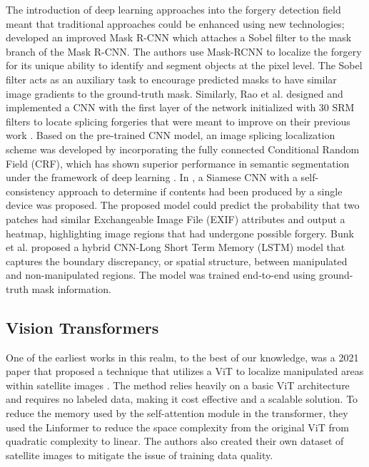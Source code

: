 The introduction of deep learning approaches into the forgery detection field meant that traditional approaches could be enhanced using new technologies; \cite{wang2019detection} developed an improved Mask R-CNN which attaches a Sobel filter to the mask branch of the Mask R-CNN. The authors use Mask-RCNN to localize the forgery for its unique ability to identify and segment objects at the pixel level. The Sobel filter acts as an auxiliary task to encourage predicted masks to have similar image gradients to the ground-truth mask. Similarly, Rao et al. \cite{Rao2020DeepLL} designed and implemented a CNN with the first layer of the network initialized with 30 SRM filters to locate splicing forgeries that were meant to improve on their previous work \cite{rao2016}. Based on the pre-trained CNN model, an image splicing localization scheme was developed by incorporating the fully connected Conditional Random Field (CRF), which has shown superior performance in semantic segmentation under the framework of deep learning \cite{noh2015learning}. In \cite{huh2018fighting}, a Siamese CNN with a self-consistency approach to determine if contents had been produced by a single device was proposed. The proposed model could predict the probability that two patches had similar Exchangeable Image File (EXIF) attributes and output a heatmap, highlighting image regions that had undergone possible forgery. Bunk et al. \cite{bunk2017detection} proposed a hybrid CNN-Long Short Term Memory (LSTM) model that captures the boundary discrepancy, or spatial structure, between manipulated and non-manipulated regions. The model was trained end-to-end using ground-truth mask information.

  \subsection{Vision Transformers } \label{sec:ss4}

 One of the earliest works in this realm, to the best of our knowledge, was a 2021 paper that proposed a technique that utilizes a ViT to localize manipulated areas within satellite images \cite{horváth2021manipulation}. The method relies heavily on a basic ViT architecture and requires no labeled data, making it cost effective and a scalable solution. To reduce the memory used by the self-attention module in the transformer, they used the Linformer \cite{wang2020linformer} to reduce the space complexity from the original ViT from quadratic complexity to linear. The authors also created their own dataset of satellite images to mitigate the issue of training data quality. 
 
